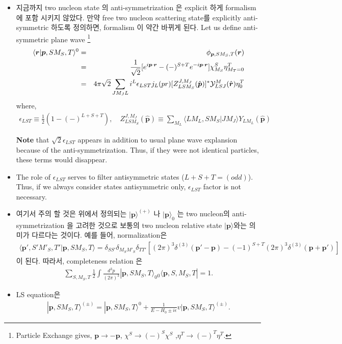 \documentclass[10pt]{article}
\def\bm{\boldsymbol}
\newcommand{\bea}{\begin{eqnarray}}
\newcommand{\eea}{\end{eqnarray}}
\newcommand{\no}{\nonumber \\}
\def\vp{{\bm p}}
\def\vr{{\bm r}}
\def\la{\langle}
\def\ra{\rangle}
\begin{document}
\begin{itemize}
\item 지금까지 two nucleon state 의 anti-symmetrization 은 
explicit 하게 formalism 에 포함 시키지 않았다.
만약 free two nucleon scattering state를 
explicitly anti-symmetric 하도록 정의하면,
formalism 이 약간 바뀌게 된다.
Let us define anti-symmetric plane wave
\footnote{Particle Exchange gives, $\vp\to -\vp$, $\chi^S\to (-)^S\chi^S$
,$\eta^T\to (-)^T\eta^T$. } 
\bea
\la \vr|\vp,S M_S,T\ra^{0}&=&\phi_{\vp,S M_S,T}(\vr)\no
 &=&\frac{1}{\sqrt{2}}[e^{i\vp\cdot\vr}-(-)^{S+T} e^{-i\vp\cdot\vr}]
    \chi^{S}_{M_S}\eta^{T}_{M_T=0} \no
 &=&4\pi\sqrt{2}\sum_{J M_J L} i^L \epsilon_{LST}
     j_L(pr)[Z^{J,M_J}_{LS M_S}(\hat{\vp})]^*
     {\cal Y}^{M}_{LSJ}(\hat{\vr})\eta^T_0   
\eea
where,
\bea
\epsilon_{LST}\equiv\frac{1}{2}(1-(-)^{L+S+T}),\quad
Z^{J,M_J}_{LS M_S}(\hat{\vp})
\equiv \sum_{M_L}\la L M_L,S M_S|J M_J\ra Y_{L M_L}(\hat{\vp})
\eea

{\bf Note} that $\sqrt{2}\epsilon_{LST}$ appears in addition to usual
plane wave explansion because of the anti-symmetrization. Thus,
if they were not identical particles, these terms would disappear.

\item The role of $\epsilon_{LST}$ serves to filter  
      antisymmetric states ($L+S+T=(odd)$). Thus, if we always
      consider states antisymmetric only, $\epsilon_{LST}$
      factor is not necessary.

\item 여기서 주의 할 것은 위에서 정의되는 
$|\vp\ra^{(+)}$ 나 $|\vp\ra_0$ 는 
two nucleon의 anti-symmetrization 을 고려한 것으로 보통의 two nucleon
relative state $|\vp\ra$와는 의미가 다르다는 것이다.
예를 들어, normalization은 
\bea
\la \vp',S' M'_S,T'|\vp,S M_S,T\ra
=\delta_{SS'}\delta_{M_S M'_S}\delta_{TT'}
 [(2\pi)^3 \delta^{(3)}(\vp'-\vp)-
 (-1)^{S+T}
 (2\pi)^3\delta^{(3)}(\vp+\vp')]
\eea
이 된다. 따라서, completeness relation 은
\bea
\sum_{S,M_S,T}\frac{1}{2}\int \frac{d^3 p}{(2\pi)^3}
|\vp,S M_S,T\ra_0 {}_0\la \vp,S,M_S,T|=1.
\eea

\item LS equation은 
\bea
|\vp,S M_S,T\ra^{(\pm)}=|\vp,S M_S,T\ra^{0}
+\frac{1}{E-H_0\pm i\epsilon} v|\vp,S M_S,T\ra^{(\pm)}.
\eea


\end{itemize}
\end{document}
